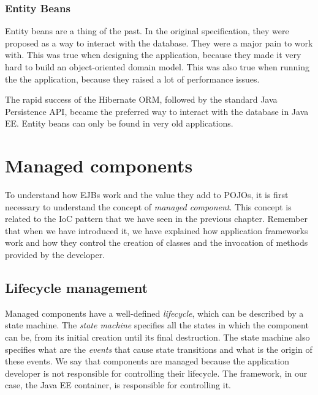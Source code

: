 \subsubsection{Entity Beans}


Entity beans are a thing of the past. In the original specification, they were proposed as a way to interact with the database. They were a major pain to work with. This was true when designing the application, because they made it very hard to build an object-oriented domain model. This was also true when running the the application, because they raised a lot of performance issues.

The rapid success of the Hibernate \ac{ORM}, followed by the standard Java Persistence API, became the preferred way to interact with the database in Java EE. Entity beans can only be found in very old applications.

\section{Managed components}

To understand how \ac{EJB}s work and the value they add to \ac{POJO}s, it is first necessary to understand the concept of \emph{managed component}. This concept is related to the \ac{IoC} pattern that we have seen in the previous chapter. Remember that when we have introduced it, we have explained how application frameworks work and how they control the creation of classes and the invocation of methods provided by the developer.

\subsection{Lifecycle management}


Managed components have a well-defined \emph{lifecycle}, which can be described by a state machine. The \emph{state machine} specifies all the states in which the component can be, from its initial creation until its final destruction. The state machine also specifies what are the \emph{events} that cause state transitions and what is the origin of these events. We say that components are managed because the application developer is not responsible for controlling their lifecycle. The framework, in our case, the \ac{Java EE} container, is responsible for controlling it.

